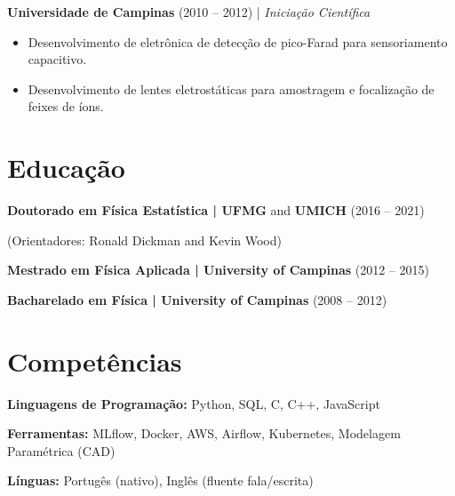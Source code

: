 \documentclass[10pt,a4paper]{article}
\begin{document}
\vspace{4pt}

\textbf{Universidade de Campinas} (2010 -- 2012) | \textit{Iniciação Científica} 
\begin{itemize}[noitemsep, topsep=0pt]
	\item Desenvolvimento de eletrônica de detecção de pico-Farad para sensoriamento capacitivo.
	\item Desenvolvimento de lentes eletrostáticas para amostragem e focalização de feixes de íons.
\end{itemize}

\section{Educação}

\textbf{Doutorado em Física Estatística | UFMG} and \textbf{UMICH} (2016 -- 2021)

(Orientadores: Ronald Dickman and Kevin Wood)

\vspace{4pt}

\textbf{Mestrado em Física Aplicada | University of Campinas} (2012 -- 2015)

\vspace{2pt}

\textbf{Bacharelado em Física | University of Campinas} (2008 -- 2012)

\section{Competências}
\textbf{Linguagens de Programação:} Python, SQL, C, C++, JavaScript

\vspace{2pt}

\textbf{Ferramentas:} MLflow, Docker, AWS, Airflow, Kubernetes, Modelagem Paramétrica (CAD)

\vspace{2pt}

\textbf{Línguas:} Portugês (nativo), Inglês (fluente fala/escrita) 
\end{document}
